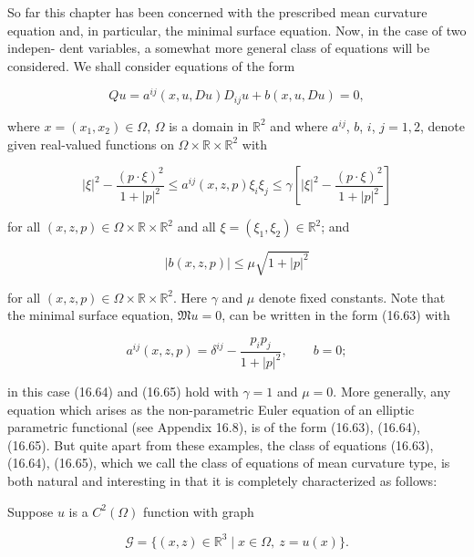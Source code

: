 So far this chapter has been concerned with the prescribed mean curvature equation
and, in particular, the minimal surface equation. Now, in the case of two indepen-
dent variables, a somewhat more general class of equations will be considered. We
shall consider equations of the form

\begin{equation}\tag{16.63}
Qu=a^{ij}(x,u,Du)D_{ij}u+b(x,u,Du)=0,
\end{equation}

\noindent where $x=(x_1,x_2)\in\Omega$, $\Omega$ is a domain in $\mathbb{R}^2$ and where $a^{ij}$, $b$, $i$, $j=1,2$, denote
given real-valued functions on $\Omega\times\mathbb{R}\times\mathbb{R}^2$ with

\begin{equation}\tag{16.64}
|\xi|^2-\frac{(p\cdot\xi)^2}{1+|p|^2}\le a^{ij}(x,z,p)\xi_i\xi_j\le \gamma\left[|\xi|^2-\frac{(p\cdot\xi)^2}{1+|p|^2}\right]
\end{equation}

\noindent for all $(x,z,p)\in\Omega\times\mathbb{R}\times\mathbb{R}^2$ and all $\xi=(\xi_1,\xi_2)\in\mathbb{R}^2$; and

\begin{equation}\tag{16.65}
|b(x,z,p)|\le \mu\sqrt{1+|p|^2}
\end{equation}

\noindent for all $(x,z,p)\in\Omega\times\mathbb{R}\times\mathbb{R}^2$. Here $\gamma$ and $\mu$ denote fixed constants.
Note that the minimal surface equation, $\mathfrak{M}u=0$, can be written in the form
(16.63) with

\begin{equation*}
a^{ij}(x,z,p)=\delta^{ij}-\frac{p_ip_j}{1+|p|^2},\qquad b=0;
\end{equation*}

\noindent in this case (16.64) and (16.65) hold with $\gamma=1$ and $\mu=0$. More generally, any
equation which arises as the non-parametric Euler equation of an elliptic parametric
functional (see Appendix 16.8), is of the form (16.63), (16.64), (16.65). But quite
apart from these examples, the class of equations (16.63), (16.64), (16.65), which we
call the class of equations of mean curvature type, is both natural and interesting in
that it is completely characterized as follows:

\noindent\hspace*{2em}Suppose $u$ is a $C^2(\Omega)$ function with graph

\[
\mathcal{G}=\{(x,z)\in\mathbb{R}^3\mid x\in\Omega,\ z=u(x)\}.
\]

